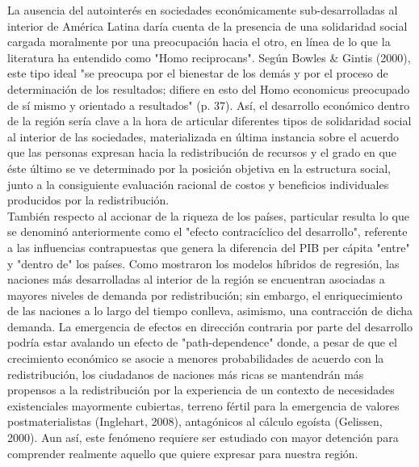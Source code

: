 \documentclass[12pt,letterpaper]{article}
\begin{document}
La ausencia del autointerés en sociedades económicamente sub-desarrolladas al interior de América Latina daría cuenta de la presencia de una solidaridad social cargada moralmente por una preocupación hacia el otro, en línea de lo que la literatura ha entendido como "Homo reciprocans". Según Bowles \& Gintis (2000), este tipo ideal "se preocupa por el bienestar de los demás y por el proceso de determinación de los resultados; difiere en esto del Homo economicus preocupado de sí mismo y orientado a resultados" (p. 37). Así, el desarrollo económico dentro de la región sería clave a la hora de articular diferentes tipos de solidaridad social al interior de las sociedades, materializada en última instancia sobre el acuerdo que las personas expresan hacia la redistribución de recursos y el grado en que éste último se ve determinado por la posición objetiva en la estructura social, junto a la consiguiente evaluación racional de costos y beneficios individuales producidos por la redistribución.\\

También respecto al accionar de la riqueza de los países, particular resulta lo que se denominó anteriormente como el "efecto contracíclico del desarrollo", referente a las influencias contrapuestas que genera la diferencia del PIB per cápita "entre" y "dentro de" los países. Como mostraron los modelos híbridos de regresión, las naciones más desarrolladas al interior de la región se encuentran asociadas a mayores niveles de demanda por redistribución; sin embargo, el enriquecimiento de las naciones a lo largo del tiempo conlleva, asimismo, una contracción de dicha demanda. La emergencia de efectos en dirección contraria por parte del desarrollo podría estar avalando un efecto de "path-dependence" donde, a pesar de que el crecimiento económico se asocie a menores probabilidades de acuerdo con la redistribución, los ciudadanos de naciones más ricas se mantendrán más propensos a la redistribución por la experiencia de un contexto de necesidades existenciales mayormente cubiertas, terreno fértil para la emergencia de valores postmaterialistas (Inglehart, 2008), antagónicos al cálculo egoísta (Gelissen, 2000). Aun así, este fenómeno requiere ser estudiado con mayor detención para comprender realmente aquello que quiere expresar para nuestra región.\\
\end{document}
